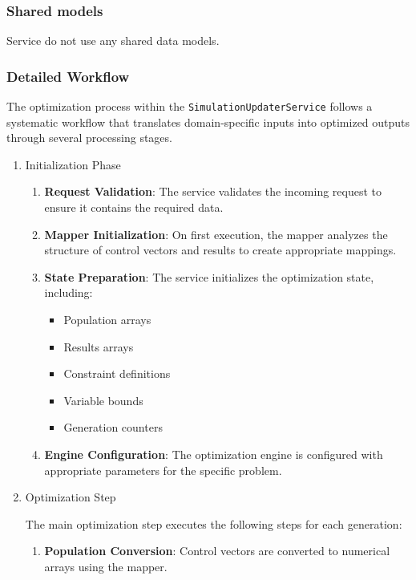 \subsubsection{Shared models}

Service do not use any shared data models.

\subsubsection{Detailed Workflow}
The optimization process within the \texttt{SimulationUpdaterService} follows a systematic workflow that translates domain-specific inputs into optimized outputs through several processing stages.

\begin{enumerate}

\item Initialization Phase

\begin{enumerate}
	\item \textbf{Request Validation}: The service validates the incoming request to ensure it contains the required data.

	\item \textbf{Mapper Initialization}: On first execution, the mapper analyzes the structure of control vectors and results to create appropriate mappings.

	\item \textbf{State Preparation}: The service initializes the optimization state, including:
	\begin{itemize}
		\item Population arrays
		\item Results arrays
		\item Constraint definitions
		\item Variable bounds
		\item Generation counters
	\end{itemize}

	\item \textbf{Engine Configuration}: The optimization engine is configured with appropriate parameters for the specific problem.
\end{enumerate}

\item Optimization Step

The main optimization step executes the following steps for each generation:

\begin{enumerate}
	\item \textbf{Population Conversion}: Control vectors are converted to numerical arrays using the mapper.


\end{enumerate}
\end{enumerate}
